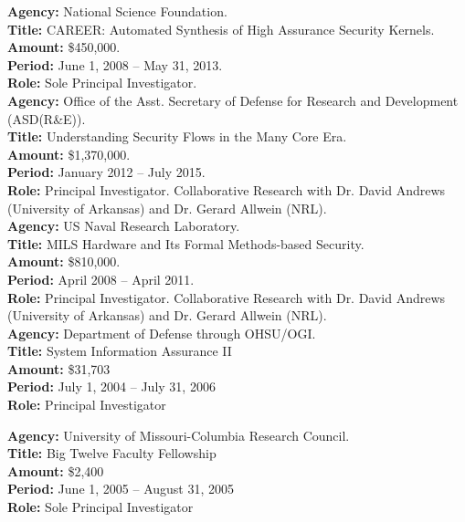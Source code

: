 \documentclass[12pt]{article} %
\begin{document}
{\bf Agency:} National Science Foundation.
\\
{\bf Title:} CAREER: Automated Synthesis of High Assurance Security Kernels.
\\
{\bf Amount:} \$450,000.
\\
{\bf Period:}   June 1, 2008  --  May 31, 2013.
\\
{\bf Role:}      Sole Principal Investigator.
\\

{\bf Agency:} Office of the Asst. Secretary of Defense for Research and Development (ASD(R\&E)).
\\
{\bf Title:} Understanding Security Flows in the Many Core Era.
\\
{\bf Amount:} \$1,370,000.
\\
{\bf Period:}   January 2012  --  July 2015.
\\
{\bf Role:}      Principal Investigator. Collaborative Research with Dr. David Andrews (University of Arkansas) and Dr. Gerard Allwein (NRL).
\\

{\bf Agency:} US Naval Research Laboratory.
\\
{\bf Title:} MILS Hardware and Its Formal Methods-based Security.
\\
{\bf Amount:} \$810,000.
\\
{\bf Period:}   April 2008  --  April 2011.
\\
{\bf Role:}      Principal Investigator. Collaborative Research with Dr. David Andrews (University of Arkansas) and Dr. Gerard Allwein (NRL).
\\


{\bf Agency:} Department of Defense through OHSU/OGI.
\\
{\bf Title:} System Information Assurance II
\\
{\bf Amount:} \$31,703 
\\
{\bf Period:}   July 1, 2004  --  July 31, 2006
\\
{\bf Role:}      Principal Investigator


{\bf Agency:} University of Missouri-Columbia Research Council.
\\
{\bf Title:} Big Twelve Faculty Fellowship
\\
{\bf Amount:} \$2,400
\\
{\bf Period:}   June 1, 2005  --  August 31, 2005 
\\
{\bf Role:}      Sole Principal Investigator
\\
\end{document}
